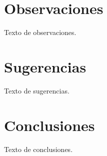 
\section{Observaciones}


Texto de observaciones.


\section{Sugerencias}


Texto de sugerencias.


\section{Conclusiones}


Texto de conclusiones.
